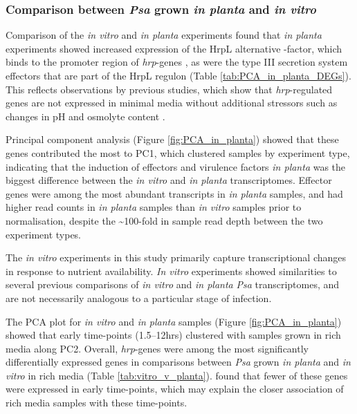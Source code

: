 \subsubsection{Comparison between \textit{Psa} grown \textit{in planta} and \textit{in vitro}}

Comparison of the \textit{in vitro} and \textit{in planta} experiments found that \textit{in planta} experiments showed increased expression of the HrpL alternative \textsigma -factor, which binds to the promoter region of \textit{hrp}-genes \citep{Fouts2002-ev}, as were the type III secretion system effectors that are part of the HrpL regulon (Table \ref{tab:PCA_in_planta_DEGs}). This reflects observations by previous studies, which show that \textit{hrp}-regulated genes are not expressed in minimal media without additional stressors such as changes in pH and osmolyte content \citep{McAtee2018-sl,Rahme_Mindrinos_Panopoulos_1992}. 

Principal component analysis (Figure \ref{fig:PCA_in_planta}) showed that these genes contributed the most to PC1, which clustered samples by experiment type, indicating that the induction of effectors and virulence factors \textit{in planta} was the biggest difference between the \textit{in vitro} and \textit{in planta} transcriptomes. Effector genes were among the most abundant transcripts in \textit{in planta} samples, and had higher read counts in \textit{in planta} samples than \textit{in vitro} samples prior to normalisation, despite the \textasciitilde 100-fold in sample read depth between the two experiment types.

The \textit{in vitro} experiments in this study primarily capture transcriptional changes in response to nutrient availability.  \textit{In vitro} experiments showed similarities to several previous comparisons of \textit{in vitro} and \textit{in planta} \textit{Psa} transcriptomes, and are not necessarily analogous to a particular stage of infection. 

The PCA plot for \textit{in vitro} and \textit{in planta} samples (Figure \ref{fig:PCA_in_planta}) showed that early time-points (1.5--12hrs) clustered with samples grown in rich media along PC2. Overall, \textit{hrp}-genes were among the most significantly differentially expressed genes in comparisons between \textit{Psa} grown \textit{in planta} and \textit{in vitro} in rich media (Table \ref{tab:vitro_v_planta}). \cite{McAtee2018-sl} found that fewer of these genes were expressed in early time-points, which may explain the closer association of rich media samples with these time-points. 

